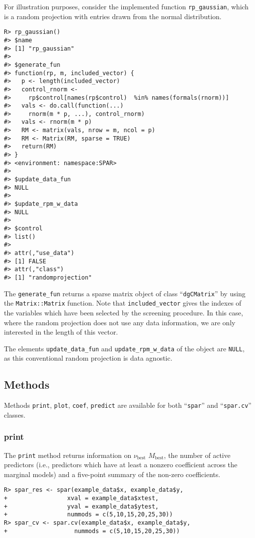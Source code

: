 \documentclass[
  article]{jss}
\begin{document}
For illustration purposes, consider the implemented function
\texttt{rp\_gaussian}, which is a random projection with entries drawn
from the normal distribution.

\begin{verbatim}
R> rp_gaussian()
#> $name
#> [1] "rp_gaussian"
#> 
#> $generate_fun
#> function(rp, m, included_vector) {
#>   p <- length(included_vector)
#>   control_rnorm <-
#>     rp$control[names(rp$control)  %in% names(formals(rnorm))]
#>   vals <- do.call(function(...)
#>     rnorm(m * p, ...), control_rnorm)
#>   vals <- rnorm(m * p)
#>   RM <- matrix(vals, nrow = m, ncol = p)
#>   RM <- Matrix(RM, sparse = TRUE)
#>   return(RM)
#> }
#> <environment: namespace:SPAR>
#> 
#> $update_data_fun
#> NULL
#> 
#> $update_rpm_w_data
#> NULL
#> 
#> $control
#> list()
#> 
#> attr(,"use_data")
#> [1] FALSE
#> attr(,"class")
#> [1] "randomprojection"
\end{verbatim}

The \texttt{generate\_fun} returns a sparse matrix object of class
``\texttt{dgCMatrix}'' by using the \texttt{Matrix::Matrix} function.
Note that \texttt{included\_vector} gives the indexes of the variables
which have been selected by the screening procedure. In this case, where
the random projection does not use any data information, we are only
interested in the length of this vector.

The elements \texttt{update\_data\_fun} and
\texttt{update\_rpm\_w\_data} of the object are \texttt{NULL}, as this
conventional random projection is data agnostic.

\subsection{Methods}\label{methods}

Methods \texttt{print}, \texttt{plot}, \texttt{coef}, \texttt{predict}
are available for both ``\texttt{spar}'' and ``\texttt{spar.cv}''
classes.

\subsubsection{print}\label{print}

The \texttt{print} method returns information on \(\nu_\text{best}\)
\(M_\text{best}\), the number of active predictors (i.e., predictors
which have at least a nonzero coefficient across the marginal models)
and a five-point summary of the non-zero coefficients.

\begin{verbatim}
R> spar_res <- spar(example_data$x, example_data$y,
+                 xval = example_data$xtest,
+                 yval = example_data$ytest,
+                 nummods = c(5,10,15,20,25,30))
R> spar_cv <- spar.cv(example_data$x, example_data$y,
+                   nummods = c(5,10,15,20,25,30))
\end{verbatim}
\end{document}

